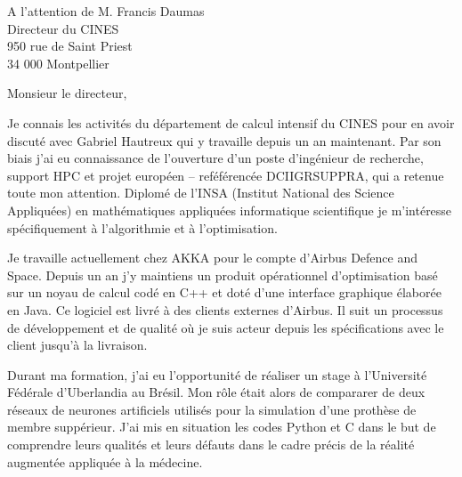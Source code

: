 \documentclass[10pt,a4paper]{lettre}
\begin{document}
\begin{letter}{A l'attention de M. Francis Daumas\\Directeur du CINES\\950 rue de Saint Priest\\34 000 Montpellier}
\address{Victor Cameo Ponz\\16 rue Peyras\\31000 Toulouse}
\nofax

\opening{Monsieur le directeur,}

{
Je connais les activités du département de calcul intensif du CINES pour en
avoir discuté avec Gabriel Hautreux qui y travaille depuis un an
maintenant.
Par son biais j'ai eu connaissance de l'ouverture d'un poste d'ingénieur de recherche,
support HPC et projet européen -- reféférencée DCIIGRSUPPRA,
qui a retenue toute mon attention.
Diplomé de l'INSA (Institut National des Science Appliquées) en
mathématiques appliquées informatique scientifique je m'intéresse
spécifiquement à l'algorithmie et à l'optimisation.

{
Je travaille
actuellement chez AKKA pour le compte d'Airbus Defence and Space.
Depuis un an j'y maintiens un produit opérationnel d'optimisation
basé sur un noyau de calcul codé en C++ et doté d'une interface graphique élaborée en Java.
Ce logiciel est livré à des clients externes d'Airbus. Il suit un
processus de développement et de qualité où
je suis acteur depuis les spécifications avec le client jusqu'à la livraison.


Durant ma formation, j'ai eu l'opportunité de réaliser un stage à
l'Université Fédérale d'Uberlandia au Brésil.
Mon rôle était alors de compararer de deux réseaux de neurones
artificiels utilisés pour la simulation d'une prothèse de membre
suppérieur.
J'ai mis en situation les codes Python et C dans le but de comprendre
leurs qualités et leurs défauts dans le cadre précis de la réalité
augmentée appliquée à la médecine. %

}}
\end{letter}
\end{document}
